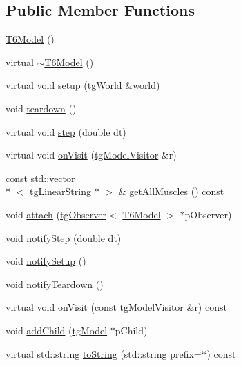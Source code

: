 \subsection*{Public Member Functions}
\begin{DoxyCompactItemize}
\item 
\hyperlink{class_t6_model_a7c31ff9c300aa319d87c2a1009f5f119}{T6\-Model} ()
\item 
virtual \hyperlink{class_t6_model_aadb1550b7e748066950131401cd8b5cf}{$\sim$\-T6\-Model} ()
\item 
virtual void \hyperlink{class_t6_model_a4ad8e9a8dd86e2ee2a293cea2b03feb8}{setup} (\hyperlink{classtg_world}{tg\-World} \&world)
\item 
void \hyperlink{class_t6_model_ae46a765cf98ef3b17c4540ee4517c343}{teardown} ()
\item 
virtual void \hyperlink{class_t6_model_ad6689b7750728d58a2a9b1b00902082b}{step} (double dt)
\item 
virtual void \hyperlink{class_t6_model_a76179a0fe40ddf849fb3523ac18c9b00}{on\-Visit} (\hyperlink{classtg_model_visitor}{tg\-Model\-Visitor} \&r)
\item 
const std\-::vector\\*
$<$ \hyperlink{classtg_linear_string}{tg\-Linear\-String} $\ast$ $>$ \& \hyperlink{class_t6_model_adc05c0a203f2fe8018f06dd346b77a9a}{get\-All\-Muscles} () const 
\item 
void \hyperlink{classtg_subject_a56ecfd33a048c3a7f1a884318d9af548}{attach} (\hyperlink{classtg_observer}{tg\-Observer}$<$ \hyperlink{class_t6_model}{T6\-Model} $>$ $\ast$p\-Observer)
\item 
void \hyperlink{classtg_subject_ad9640aa7fcc1e0b4ce8a913a4ce1ea42}{notify\-Step} (double dt)
\item 
void \hyperlink{classtg_subject_a80799e5d0c8512d3d05a55764790392b}{notify\-Setup} ()
\item 
void \hyperlink{classtg_subject_adf7a60dbb0faf0de5528f862e7953e63}{notify\-Teardown} ()
\item 
virtual void \hyperlink{classtg_model_aee6457e0fc54d5570b87bfc779f9b1c0}{on\-Visit} (const \hyperlink{classtg_model_visitor}{tg\-Model\-Visitor} \&r) const 
\item 
void \hyperlink{classtg_model_a292c17848b96caee32b2286e44c13f2f}{add\-Child} (\hyperlink{classtg_model}{tg\-Model} $\ast$p\-Child)
\item 
virtual std\-::string \hyperlink{classtg_model_af37b0c1a6d4060bfe0bb9b5038a17725}{to\-String} (std\-::string prefix=\char`\"{}\char`\"{}) const 

\end{DoxyCompactItemize}
